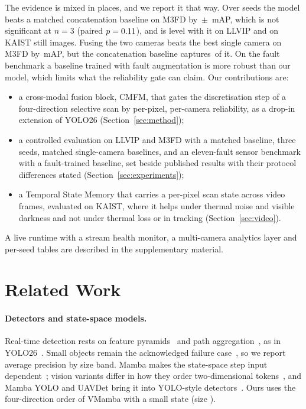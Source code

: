 The evidence is mixed in places, and we report it that way. Over \resLlvipCffmVtwoSeedCount{} seeds the model beats a matched concatenation baseline on M3FD by \marMfdVtwoVsConcatMdMeanMap{}\,$\pm$\,\marMfdVtwoVsConcatMdStdMap{} mAP, which is not significant at $n=3$ (paired $p=0.11{}$), and is level with it on LLVIP and on KAIST still images. Fusing the two cameras beats the best single camera on M3FD by \gainMfdCffmVtwoOverBestMeanMap{}\,mAP, but the concatenation baseline captures \gainMfdConcatMdOverBestMeanMap{}\,of it. On the fault benchmark a baseline trained with fault augmentation is more robust than our model, which limits what the reliability gate can claim. Our contributions are:
\begin{itemize}
\item a cross-modal fusion block, CMFM, that gates the discretisation step of a four-direction selective scan by per-pixel, per-camera reliability, as a drop-in extension of YOLO26 (Section~\ref{sec:method});
\item a controlled evaluation on LLVIP and M3FD with a matched baseline, three seeds, matched single-camera baselines, and an eleven-fault sensor benchmark with a fault-trained baseline, set beside published results with their protocol differences stated (Section~\ref{sec:experiments});
\item a Temporal State Memory that carries a per-pixel scan state across video frames, evaluated on KAIST, where it helps under thermal noise and visible darkness and not under thermal loss or in tracking (Section~\ref{sec:video}).
\end{itemize}
A live runtime with a stream health monitor, a multi-camera analytics layer and per-seed tables are described in the supplementary material.

\section{Related Work}
\label{sec:related}
\paragraph{Detectors and state-space models.}
Real-time detection rests on feature pyramids~\cite{lin2017fpn} and path aggregation~\cite{liu2018panet}, as in YOLO26~\cite{yolo26_2026}. Small objects remain the acknowledged failure case~\cite{wang2025hpsdetr,li2025cfmw}, so we report average precision by size band. Mamba makes the state-space step input dependent~\cite{gu2023mamba}; vision variants differ in how they order two-dimensional tokens~\cite{zhu2024vim,liu2024vmamba,hatamizadeh2025mambavision}, and Mamba YOLO and UAVDet bring it into YOLO-style detectors~\cite{wang2025mambayolo,yang2026uavdet}. Ours uses the four-direction order of VMamba with a small state (size \cfgDState{}).

